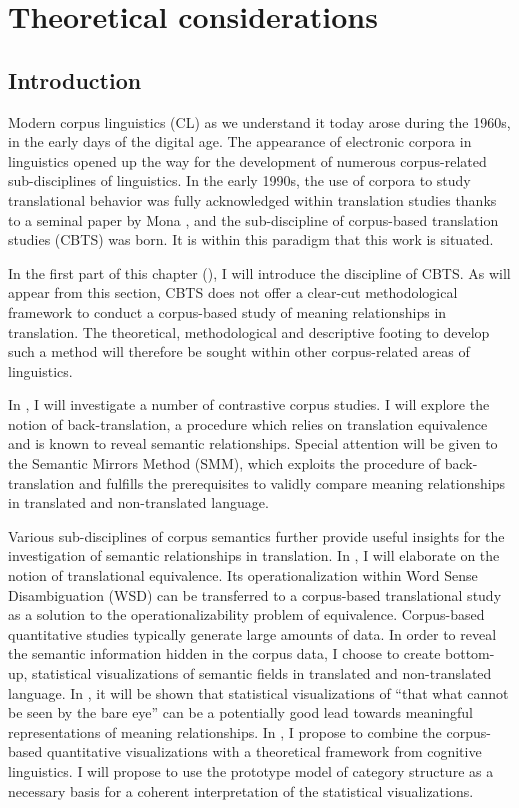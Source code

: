 \chapter{Theoretical considerations}
\label{sec:2}

\section{Introduction}
\label{sec:2.1}  
Modern corpus linguistics (CL) as we understand it today arose during the 1960s, in the early days of the digital age. The appearance of electronic corpora in linguistics opened up the way for the development of numerous corpus-related sub-disciplines of linguistics. In the early 1990s, the use of corpora to study translational behavior was fully acknowledged within translation studies thanks to a seminal paper by Mona \citet{baker_corpus_1993}, and the sub-discipline of corpus-based translation studies (CBTS) was born. It is within this paradigm that this work is situated.

In the first part of this chapter (), I will introduce the discipline of CBTS. As will appear from this section, CBTS does not offer a clear-cut methodological framework to conduct a corpus-based study of meaning relationships in translation. The theoretical, methodological and descriptive footing to develop such a method will therefore be sought within other corpus-related areas of linguistics.

In , I will investigate a number of contrastive corpus studies. I will explore the notion of back-translation, a procedure which relies on translation equivalence and is known to reveal semantic relationships. Special attention will be given to the Semantic Mirrors Method (SMM), which exploits the procedure of back-translation and fulfills the prerequisites to validly compare meaning relationships in translated and non-translated language.

Various sub-disciplines of corpus semantics further provide useful insights for the investigation of semantic relationships in translation. In , I will elaborate on the notion of translational equivalence. Its operationalization within Word Sense Disambiguation (WSD) can be transferred to a corpus-based translational study as a solution to the operationalizability problem of equivalence. Corpus-based quantitative studies typically generate large amounts of data. In order to reveal the semantic information hidden in the corpus data, I choose to create bottom-up, statistical visualizations of semantic fields in translated and non-translated language. In , it will be shown that statistical visualizations of ``that what cannot be seen by the bare eye'' can be a potentially good lead towards meaningful representations of meaning relationships. In , I propose to combine the corpus-based quantitative visualizations with a theoretical framework from cognitive linguistics. I will propose to use the prototype model of category structure as a necessary basis for a coherent interpretation of the statistical visualizations.

